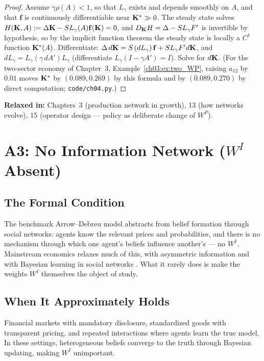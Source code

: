\documentclass[../structural_economics_book.tex]{subfiles}
\begin{document}
\begin{proof}
Assume $\gamma\rho(A) < 1$, so that $L_\gamma$ exists and depends smoothly on $A$, and that $\mathbf{f}$ is continuously differentiable near $\mathbf{K}^* \gg 0$. The steady state solves $H(\mathbf{K}, A) := \Delta\mathbf{K} - S L_\gamma(A) \mathbf{f}(\mathbf{K}) = 0$, and $D_{\mathbf{K}}H = \Delta - SL_\gamma F'$ is invertible by hypothesis, so by the implicit function theorem the steady state is locally a $C^1$ function $\mathbf{K}^*(A)$. Differentiate: $\Delta\, d\mathbf{K} = S\,(dL_\gamma)\,\mathbf{f} + S L_\gamma F' d\mathbf{K}$, and $dL_\gamma = L_\gamma(\gamma\, dA')L_\gamma$ (differentiate $L_\gamma(I - \gamma A') = I$). Solve for $d\mathbf{K}$. (For the two-sector economy of Chapter~3, Example~\ref{ch03:ex:two_WP}, raising $a_{12}$ by $0.01$ moves $\mathbf{K}^*$ by $(0.089, 0.269)$ by this formula and by $(0.089, 0.270)$ by direct computation; \texttt{code/ch04.py}.)
\end{proof}

\textbf{Relaxed in:} Chapters~3 (production network in growth), 13 (how networks evolve), 15 (operator design --- policy as deliberate change of $W^P$).


\section{A3: No Information Network ($W^I$ Absent)}
\label{ch04:sec:A3}

\subsection{The Formal Condition}

The benchmark Arrow--Debreu model abstracts from belief formation through social networks: agents know the relevant prices and probabilities, and there is no mechanism through which one agent's beliefs influence another's --- no $W^I$. Mainstream economics relaxes much of this, with asymmetric information and with Bayesian learning in social networks \citep{acemoglu2011bayesian}. What it rarely does is make the weights $W^I$ themselves the object of study.

\subsection{When It Approximately Holds}

Financial markets with mandatory disclosure, standardized goods with transparent pricing, and repeated interactions where agents learn the true model. In these settings, heterogeneous beliefs converge to the truth through Bayesian updating, making $W^I$ unimportant.
\end{document}

